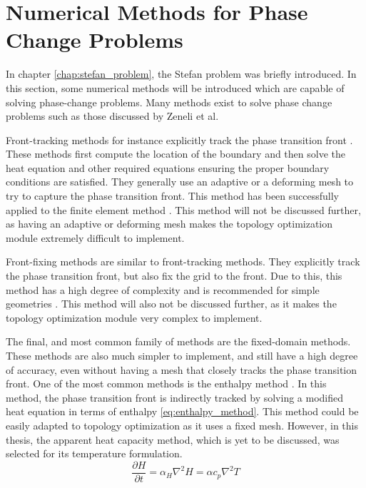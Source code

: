\section{Numerical Methods for Phase Change Problems}
In chapter \ref{chap:stefan_problem}, the Stefan problem was briefly introduced. In this section, some numerical methods will be introduced which are capable of solving phase-change problems. Many methods exist to solve phase change problems such as those discussed by Zeneli et al. \cite{Zeneli_Nikolopoulos_Karellas_Nikolopoulos_2021}

Front-tracking methods for instance explicitly track the phase transition front \cite{Dehghan_Najafi_2016}. These methods first compute the location of the boundary and then solve the heat equation and other required equations ensuring the proper boundary conditions are satisfied. They generally use an adaptive or a deforming mesh to try to capture the phase transition front. This method has been successfully applied to the finite element method \cite{Zhao_Heinrich_2001}. This method will not be discussed further, as having an adaptive or deforming mesh makes the topology optimization module extremely difficult to implement.

Front-fixing methods are similar to front-tracking methods. They explicitly track the phase transition front, but also fix the grid to the front. Due to this, this method has a high degree of complexity and is recommended for simple geometries \cite{Zeneli_Nikolopoulos_Karellas_Nikolopoulos_2021}. This method will also not be discussed further, as it makes the topology optimization module very complex to implement.

The final, and most common family of methods are the fixed-domain methods. These methods are also much simpler to implement, and still have a high degree of accuracy, even without having a mesh that closely tracks the phase transition front. One of the most common methods is the enthalpy method \cite{Voller_Cross_Markatos_1987}. In this method, the phase transition front is indirectly tracked by solving a modified heat equation in terms of enthalpy \ref{eq:enthalpy_method}. This method could be easily adapted to topology optimization as it uses a fixed mesh. However, in this thesis, the apparent heat capacity method, which is yet to be discussed, was selected for its temperature formulation.
\begin{equation}
    \frac{\partial H}{\partial t} = \alpha_H\nabla^2H=\alpha c_p \nabla^2 T
    \label{eq:enthalpy_method}
\end{equation}

